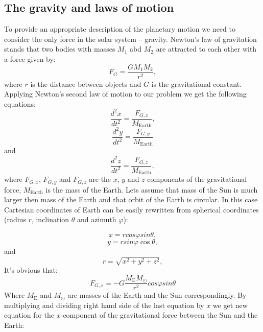 \documentclass[10pt]{article}
\begin{document}
\subsection{The gravity and laws of motion}
To provide an appropriate description of the planetary motion we need to consider the only force in the solar system  -- gravity. Newton's law of gravitation stands that two bodies with masses $M_1$ abd $M_2$ are attracted to each other with a force given by:
\[
F_G=\frac{GM_{1}M_{2}}{r^2},
\]
where $r$ is the distance between objects and $G$ is the gravitational constant.
Applying  Newton's second law of motion to our problem we get the following equations:
\[
\frac{d^2x}{dt^2}=\frac{F_{G,x}}{M_{\mathrm{Earth}}},
\] 
\[
\frac{d^2y}{dt^2}=\frac{F_{G,y}}{M_{\mathrm{Earth}}}
\]
and
\[
\frac{d^2z}{dt^2}=\frac{F_{G,z}}{M_{\mathrm{Earth}}},
\]
where $F_{G,x}$, $F_{G,y}$ and $F_{G,z}$ are the $x$, $y$ and $z$ components of the gravitational force, $M_{\mathrm{Earth}}$ is the mass of the Earth.
Lets assume that mass of the Sun is much larger then mass of the Earth and that orbit of the Earth is circular. In this case Cartesian coordinates of Earth can be easily rewritten from spherical coordinates (radius $r$, inclination $\theta$ and azimuth $\varphi$):

\[
x=r cos\varphi sin\theta,
\]
\[
y=r sin\varphi\cos\theta,
\]
and
\[
r=\sqrt{x^2+y^2+z^2},
\]
It's obvious that:
\[
{F_{G,x}}=-G\frac{M_{\mathrm{E}}M_{\odot}}{r^2}cos\varphi sin\theta
\]
Where $M_{\mathrm{E}}$ and $M_{\odot}$ are masses of the Earth and the Sun correspondingly. By multiplying and dividing right hand side of the last equation by $x$ we get new equation for the $x$-component of the gravitational force between the Sun and the Earth:
\end{document}
